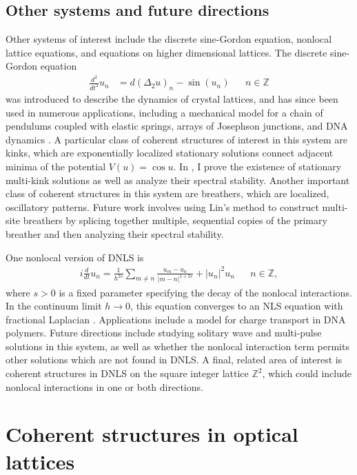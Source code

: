\documentclass[12pt,reqno,oneside,hidelinks]{article}
\begin{document}
\subsection*{Other systems and future directions}

Other systems of interest include the discrete sine-Gordon equation, nonlocal lattice equations, and equations on higher dimensional lattices. The discrete sine-Gordon equation
\begin{align*}
	\frac{d^2}{dt^2}u_n &= d (\Delta_2 u)_n - \sin(u_n) && n \in \mathbb{Z}
\end{align*}
was introduced to describe the dynamics of crystal lattices, and has since been used in numerous applications, including a mechanical model for a chain of pendulums coupled with elastic springs, arrays of Josephson junctions, and DNA dynamics \cite{braun2004}. A particular class of coherent structures of interest in this system are kinks, which are exponentially localized stationary solutions connect adjacent minima of the potential $V(u) = \cos u$. In \cite{parkerSG}, I prove the existence of stationary multi-kink solutions as well as analyze their spectral stability. Another important class of coherent structures in this system are breathers, which are localized, oscillatory patterns. Future work involves using Lin's method to construct multi-site breathers by splicing together multiple, sequential copies of the primary breather and then analyzing their spectral stability.

One nonlocal version of DNLS \cite{Kirkpatrick2013} is
\begin{align*}
    i \frac{d}{dt} u_n = \frac{1}{h^{2s}} \sum_{m \neq n} \frac{u_m - u_n}{|m - n|^{1+2s}} + |u_n|^2 u_n && n \in \mathbb{Z},
\end{align*}
where $s > 0$ is a fixed parameter specifying the decay of the nonlocal interactions. In the continuum limit $h\rightarrow 0$, this equation converges to an NLS equation with fractional Laplacian \cite{Kirkpatrick2013}. Applications include a model for charge transport in DNA polymers. Future directions include studying solitary wave and multi-pulse solutions in this system, as well as whether the nonlocal interaction term permits other solutions which are not found in DNLS. A final, related area of interest is coherent structures in DNLS on the square integer lattice $\mathbb{Z}^2$, which could include nonlocal interactions in one or both directions. 

\section*{Coherent structures in optical lattices}
\end{document}
